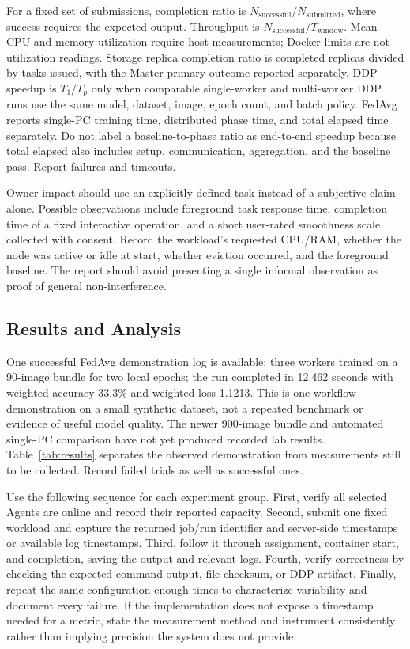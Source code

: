 \documentclass{article}
\begin{document}
For a fixed set of submissions, completion ratio is \(N_{\mathrm{successful}}/N_{\mathrm{submitted}}\), where success requires the expected output. Throughput is \(N_{\mathrm{successful}}/T_{\mathrm{window}}\). Mean CPU and memory utilization require host measurements; Docker limits are not utilization readings. Storage replica completion ratio is completed replicas divided by tasks issued, with the Master primary outcome reported separately. DDP speedup is \(T_1/T_p\) only when comparable single-worker and multi-worker DDP runs use the same model, dataset, image, epoch count, and batch policy. FedAvg reports single-PC training time, distributed phase time, and total elapsed time separately. Do not label a baseline-to-phase ratio as end-to-end speedup because total elapsed also includes setup, communication, aggregation, and the baseline pass. Report failures and timeouts.

Owner impact should use an explicitly defined task instead of a subjective claim alone. Possible observations include foreground task response time, completion time of a fixed interactive operation, and a short user-rated smoothness scale collected with consent. Record the workload's requested CPU/RAM, whether the node was active or idle at start, whether eviction occurred, and the foreground baseline. The report should avoid presenting a single informal observation as proof of general non-interference.

	\subsection{Results and Analysis}
One successful FedAvg demonstration log is available: three workers trained on a 90-image bundle for two local epochs; the run completed in 12.462 seconds with weighted accuracy 33.3\% and weighted loss 1.1213. This is one workflow demonstration on a small synthetic dataset, not a repeated benchmark or evidence of useful model quality. The newer 900-image bundle and automated single-PC comparison have not yet produced recorded lab results. Table~\ref{tab:results} separates the observed demonstration from measurements still to be collected. Record failed trials as well as successful ones.

Use the following sequence for each experiment group. First, verify all selected Agents are online and record their reported capacity. Second, submit one fixed workload and capture the returned job/run identifier and server-side timestamps or available log timestamps. Third, follow it through assignment, container start, and completion, saving the output and relevant logs. Fourth, verify correctness by checking the expected command output, file checksum, or DDP artifact. Finally, repeat the same configuration enough times to characterize variability and document every failure. If the implementation does not expose a timestamp needed for a metric, state the measurement method and instrument consistently rather than implying precision the system does not provide.
\end{document}
